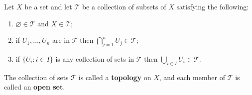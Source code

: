 Let $X$ be a set and let $\mathcal{T}$ be a collection of subsets of $X$ satisfying the following:

\begin{enumerate}
\item[(a)] $\varnothing \in \mathcal{T}$ and $X \in \mathcal{T}$;
\item[(b)] if $U_1, \ldots, U_n$ are in $\mathcal{T}$ then $\bigcap_{j=1}^{n} U_j \in \mathcal{T}$;
\item[(c)] if $\{U_i : i \in I\}$ is any collection of sets in $\mathcal{T}$ then $\bigcup_{i \in I} U_i \in \mathcal{T}$.
\end{enumerate}

The collection of sets $\mathcal{T}$ is called a \textbf{topology} on $X$, and each member of $\mathcal{T}$ is called an \textbf{open set}.
